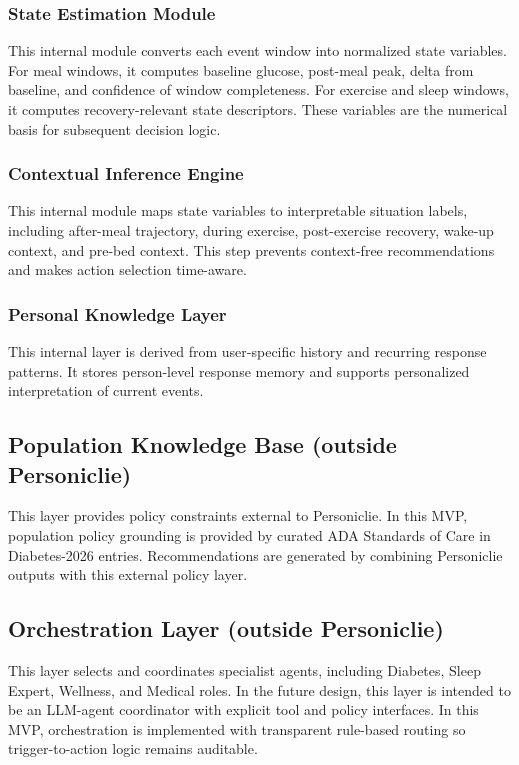\documentclass[11pt]{article}
\begin{document}
\subsubsection{State Estimation Module}
This internal module converts each event window into normalized state variables. For meal windows, it computes baseline glucose, post-meal peak, delta from baseline, and confidence of window completeness. For exercise and sleep windows, it computes recovery-relevant state descriptors. These variables are the numerical basis for subsequent decision logic.

\subsubsection{Contextual Inference Engine}
This internal module maps state variables to interpretable situation labels, including after-meal trajectory, during exercise, post-exercise recovery, wake-up context, and pre-bed context. This step prevents context-free recommendations and makes action selection time-aware.

\subsubsection{Personal Knowledge Layer}
This internal layer is derived from user-specific history and recurring response patterns. It stores person-level response memory and supports personalized interpretation of current events.

\subsection{Population Knowledge Base (outside Personiclie)}
This layer provides policy constraints external to Personiclie. In this MVP, population policy grounding is provided by curated ADA Standards of Care in Diabetes-2026 entries. Recommendations are generated by combining Personiclie outputs with this external policy layer.

\subsection{Orchestration Layer (outside Personiclie)}
This layer selects and coordinates specialist agents, including Diabetes, Sleep Expert, Wellness, and Medical roles. In the future design, this layer is intended to be an LLM-agent coordinator with explicit tool and policy interfaces. In this MVP, orchestration is implemented with transparent rule-based routing so trigger-to-action logic remains auditable.
\end{document}
